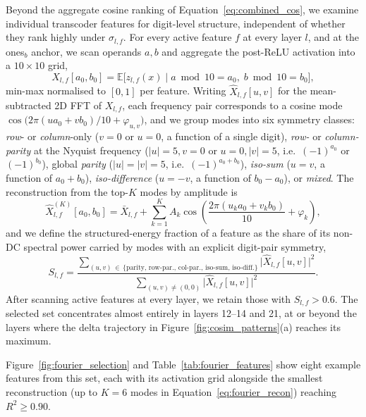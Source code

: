 Beyond the aggregate cosine ranking of Equation~\ref{eq:combined_cos}, we examine
individual transcoder features for digit-level structure, independent of whether
they rank highly under \(\sigma_{l,f}\). For every active feature \(f\) at every
layer \(l\), and at the ones$_b$ anchor, we scan operands \(a,b\) and aggregate the
post-ReLU activation into a \(10\times10\) grid,
\begin{equation}
X_{l,f}[a_0,b_0]
=
\mathbb{E}\bigl[z_{l,f}(x) \mid a\bmod 10=a_0,\; b\bmod 10=b_0\bigr],
\label{eq:fourier_grid}
\end{equation}
min-max normalised to \([0,1]\) per feature.  Writing
\(\hat X_{l,f}[u,v]\) for the mean-subtracted 2D FFT of \(X_{l,f}\), each frequency
pair corresponds to a cosine mode \(\cos\bigl(2\pi(ua_0+vb_0)/10+\varphi_{u,v}\bigr)\),
and we group modes into six symmetry classes: \emph{row}- or \emph{column}-only
(\(v{=}0\) or \(u{=}0\), a function of a single digit), \emph{row-} or
\emph{column-parity} at the Nyquist frequency (\(|u|{=}5,v{=}0\) or \(u{=}0,|v|{=}5\),
i.e.\ \((-1)^{a_0}\) or \((-1)^{b_0}\)), global \emph{parity} (\(|u|{=}|v|{=}5\), i.e.\
\((-1)^{a_0+b_0}\)), \emph{iso-sum} (\(u{=}v\), a function of \(a_0{+}b_0\)),
\emph{iso-difference} (\(u{=}{-}v\), a function of \(b_0{-}a_0\)), or \emph{mixed}. The reconstruction from the top-\(K\) modes by amplitude is
\begin{equation}
\hat{X}_{l,f}^{(K)}[a_0,b_0]
=
\bar X_{l,f} + \sum_{k=1}^{K} A_k\cos\!\left(\frac{2\pi(u_ka_0+v_kb_0)}{10}+\varphi_k\right),
\label{eq:fourier_recon}
\end{equation}
and we define the structured-energy fraction of a feature as the share of its non-DC
spectral power carried by modes with an explicit digit-pair symmetry,
\begin{equation}
S_{l,f}
=
\frac{\displaystyle\sum_{(u,v)\,\in\,\{\text{parity, row-par., col-par., iso-sum, iso-diff.}\}} \bigl|\hat X_{l,f}[u,v]\bigr|^2}
     {\displaystyle\sum_{(u,v)\neq(0,0)} \bigl|\hat X_{l,f}[u,v]\bigr|^2}.
\label{eq:structured_energy}
\end{equation}
After scanning active features at every layer, we retain those with
\(S_{l,f}>0.6\). The selected set concentrates almost entirely in layers 12--14 and
21, at or beyond the layers where the delta trajectory in
Figure~\ref{fig:cosim_patterns}(a) reaches its maximum.

Figure~\ref{fig:fourier_selection} and Table~\ref{tab:fourier_features} show eight example features from this set, each
with its activation grid alongside the smallest reconstruction (up to \(K{=}6\)
modes in Equation~\ref{eq:fourier_recon}) reaching \(R^2\geq0.90\). 


